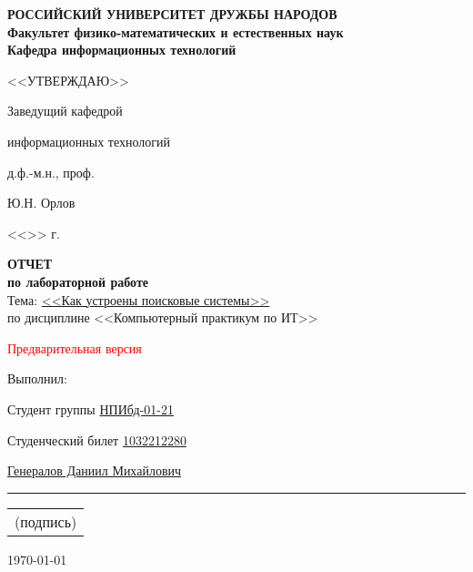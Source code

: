 \documentclass[a4page]{article}
\newcommand\signature{%
   \begin{minipage}[t]{5cm}
   \vspace*{1.5ex}  %
   \hrule
   \vspace{1mm} %
   \centering
   \begin{tabular}[t]{c}
   \small{(подпись)}
   \end{tabular}
   \end{minipage}}
\newcommand{\emptydate}{<<\underline{\phantom{99}}>> \underline{\phantom{февралиюня}} \the\year{} г.}
\begin{document}
 
 
\begin{titlepage}
\setlength{\parindent}{0cm}

\begin{center}
\hfill \break 
\textbf{
\large{РОССИЙСКИЙ УНИВЕРСИТЕТ ДРУЖБЫ НАРОДОВ}\\
\normalsize{Факультет физико-математических и естественных наук}\\ 
\normalsize{Кафедра информационных технологий}\\
}
\vspace*{\fill}

\begin{flushright}
<<УТВЕРЖДАЮ>>

Заведущий кафедрой 

информационных технологий

д.ф.-м.н., проф.

\underline{\phantom{Ю.Н. Орлов}}Ю.Н. Орлов

\emptydate
\end{flushright}

\Large{\textbf{ОТЧЕТ\\ по лабораторной работе }}
\\
\normalsize{Тема: \underline{<<Как устроены поисковые системы>>}}
\\
по дисциплине <<Компьютерный практикум по ИТ>>
\vspace*{\fill}

\begin{LARGE}
\textcolor{red}{Предварительная версия}
\end{LARGE}
\end{center}
 
\begin{adjustwidth}{0.6\textwidth}{0pt}
Выполнил:
 
 Студент группы  \underline{НПИбд-01-21}
 
 Студенческий билет \textnumero{} \underline{1032212280}
 
 \underline{Генералов Даниил Михайлович}
 
\vspace{6pt}

  \signature
 \vspace{6pt}
 
 \today 
 \\
 
 \vspace{0.5cm}
 

\end{adjustwidth}
\end{titlepage}
\end{document}
